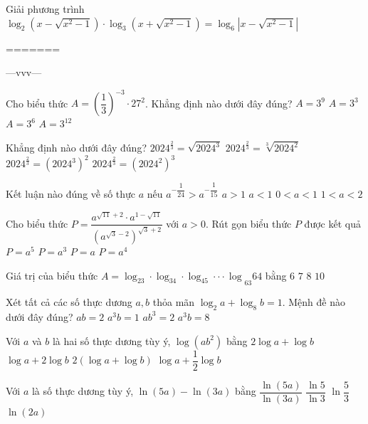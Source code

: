 \begin{ex}
Giải phương trình $\log _2\left(x-\sqrt{x^2-1}\right) \cdot \log _3\left(x+\sqrt{x^2-1}\right)=\log _6\left| x-\sqrt{x^2-1} \right|$
\end{ex}
=======
\begin{name}
	{\tenchude}{\tendethi}{---vvv---}{\thoigian}
\end{name}
\setcounter{ex}{0}\setcounter{bt}{0}
\begin{ex}
Cho biểu thức $A=\left(\dfrac{1}{3}\right)^{-3} \cdot 27^2$. Khẳng định nào dưới đây đúng?
\choice
{$A=3^9$}
{$A=3^3$}
{$A=3^6$}
{$A={3^{12}}$}
\end{ex}
\begin{ex}
Khẳng định nào dưới đây đúng?
\choice
{${{2024}^{\tfrac{2}{3}}}=\sqrt{{{2024}^3}}$}
{${{2024}^{\tfrac{2}{3}}}=\sqrt[3]{{{2024}^2}}$}
{${{2024}^{\tfrac{2}{3}}}={{\left({{2024}^3}\right)}^2}$}
{${{2024}^{\tfrac{2}{3}}}={{\left({{2024}^2}\right)}^3}$}
\end{ex}
\begin{ex}
Kết luận nào đúng về số thực $a$ nếu ${a^{-\dfrac{1}{24}}}>{a^{-\dfrac{1}{15}}}$
\choice
{$a>1$}
{$a<1$}
{$0<a<1$}
{$1<a<2$}
\end{ex}
\begin{ex}
Cho biểu thức $P=\dfrac{{a^{\sqrt{11}+2}} \cdot {a^{1-\sqrt{11}}}}{{{\left({a^{\sqrt{3}-2}}\right)}^{\sqrt{3}+2}}}$ với $a>0$. Rút gọn biểu thức $P$ được kết quả
\choice
{$P=a^5$}
{$P=a^3$}
{$P=a$}
{$P=a^4$}
\end{ex}
\begin{ex}
Giá trị của biểu thức $A={{\log _23 \cdot \log _34 \cdot \log _45 \cdot \cdot \cdot \log }_{63}}64$ bằng
\choice
{$6$}
{$7$}
{$8$}
{$10$}
\end{ex}
\begin{ex}
Xét tất cả các số thực dương $a,b$ thỏa mãn $\log _2a+\log _8b=1$. Mệnh đề nào dưới đây đúng?
\choice
{$ab=2$}
{$a^3b=1$}
{$ab^3=2$}
{$a^3b=8$}
\end{ex}
\begin{ex}
Với $a$ và $b$ là hai số thực dương tùy ý, $\log \left(ab^2\right)$ bằng
\choice
{$2\log a+\log b$}
{$\log a+2\log b$}
{$2\left(\log a+\log b\right)$}
{$\log a+\dfrac{1}{2}\log b$}
\end{ex}
\begin{ex}
Với $a$ là số thực dương tùy ý, $\ln (5a)-\ln (3a)$ bằng
\choice
{$\dfrac{\ln (5a)}{\ln (3a)}$}
{$\dfrac{\ln 5}{\ln 3}$}
{$\ln \dfrac{5}{3}$}
{$\ln (2a)$}
\end{ex}
